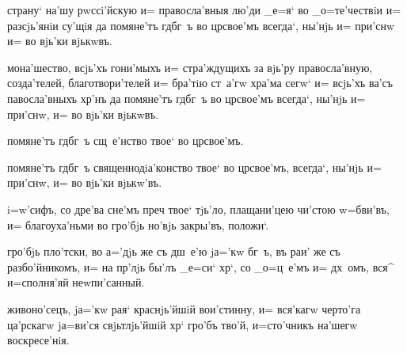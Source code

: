 
 страну` на'шу рwссi'йскую и= 
правосла'вныя лю'ди _е=я` во _о=те'чествiи и= разсjь'янiи 
су'щiя да помяне'тъ гд бг~ъ во цр свое'мъ всегда`, 
ны'нjь и= при'снw и= во вjь'ки вjькwвъ.

 мона'шество, всjь'хъ гони'мыхъ и= 
стра'ждущихъ за вjь'ру правосла'вную, созда'телей, 
благотвори'телей и= бра'тiю ст~а'гw хра'ма сегw` и= 
всjь'хъ ва'съ павосла'вныхъ хр'нъ да помяне'тъ 
гд бг~ъ во цр свое'мъ всегда`, ны'нjь и= при'снw, 
и= во вjь'ки вjькwвъ.

   
   
   
   
   
  помяне'тъ гд бг~ъ сщ~е'нство твое` 
во цр свое'мъ.

     помяне'тъ гд бг~ъ 
священнодiа'конство твое` во цр свое'мъ, всегда`, 
ны'нjь и= при'снw, и= во вjь'ки вjькw'въ.


 i=w'сифъ, со дре'ва сне'мъ преч 
твое` тjь'ло, плащани'цею чи'стою w=бви'въ, и= 
благоуха'ньми во гро'бjь но'вjь закры'въ, положи`.

 гро'бjь пло'тски, во а='дjь же съ дш~е'ю jа='кw 
бг~ъ, въ раи' же съ разбо'йникомъ, и= на пр'лjь бы'лъ 
_е=си` хр`, со _о=ц~е'мъ и= дх~омъ, вся^ и=сполня'яй 
неwпи'санный.

 живоно'сецъ, jа='кw рая` краснjь'йшiй 
вои'стинну, и= вся'кагw черто'га ца'рскагw jа=ви'ся 
свjьтлjь'йшiй хр` гро'бъ тво'й, и=сто'чникъ на'шегw 
воскресе'нiя.


